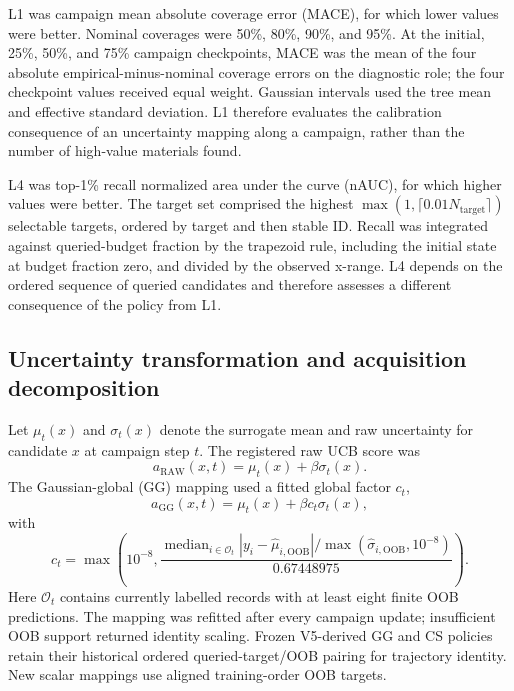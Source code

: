 \documentclass[10pt]{article}
\begin{document}
L1 was campaign mean absolute coverage error (MACE), for which lower values
were better. Nominal coverages were 50\%, 80\%, 90\%, and 95\%. At the
initial, 25\%, 50\%, and 75\% campaign checkpoints, MACE was the mean of the
four absolute empirical-minus-nominal coverage errors on the diagnostic role;
the four checkpoint values received equal weight. Gaussian intervals used the
tree mean and effective standard deviation. L1 therefore evaluates the
calibration consequence of an uncertainty mapping along a campaign, rather
than the number of high-value materials found.

L4 was top-1\% recall normalized area under the curve (nAUC), for which higher
values were better. The target set comprised the highest
$\max(1,\lceil0.01N_{\mathrm{target}}\rceil)$ selectable targets, ordered by
target and then stable ID. Recall was integrated against queried-budget
fraction by the trapezoid rule, including the initial state at budget fraction
zero, and divided by the observed x-range. L4 depends on the ordered sequence
of queried candidates and therefore assesses a different consequence of the
policy from L1.

\subsection{Uncertainty transformation and acquisition decomposition}
Let $\mu_t(x)$ and $\sigma_t(x)$ denote the surrogate mean and raw uncertainty
for candidate $x$ at campaign step $t$. The registered raw UCB score was
\begin{equation}
a_{\mathrm{RAW}}(x,t)=\mu_t(x)+\beta\sigma_t(x).
\end{equation}
The Gaussian-global (GG) mapping used a fitted global factor $c_t$,
\begin{equation}
a_{\mathrm{GG}}(x,t)=\mu_t(x)+\beta c_t\sigma_t(x),
\end{equation}
with
\begin{equation}
c_t=\max\!\left(10^{-8},
\frac{\operatorname{median}_{i\in\mathcal O_t}
|y_i-\hat\mu_{i,\mathrm{OOB}}|/
\max(\hat\sigma_{i,\mathrm{OOB}},10^{-8})}
{0.67448975}\right).
\end{equation}
Here $\mathcal O_t$ contains currently labelled records with at least eight
finite OOB predictions. The mapping was refitted after every campaign update;
insufficient OOB support returned identity scaling. Frozen V5-derived GG and
CS policies retain their historical ordered queried-target/OOB pairing for
trajectory identity. New scalar mappings use aligned training-order OOB
targets.
\end{document}
